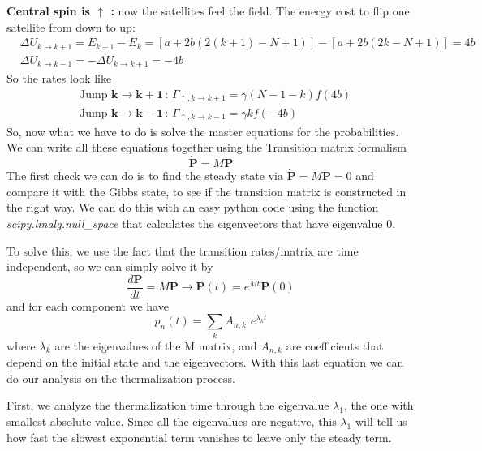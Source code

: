 \documentclass{article}
\begin{document}
\textbf{Central spin is $\uparrow$ :} now the satellites feel the field. The energy cost to flip one satellite from down to up:
\begin{align}
&\Delta U_{k\to k+1} = E_{k+1} - E_k = [a + 2b(2(k+1) - N + 1)] - [a + 2b(2k - N + 1)] = 4b\\
&\Delta U_{k\to k-1}=-\Delta U_{k\to k+1}=-4b
\end{align}
So the rates look like
\begin{align}
&\text{Jump } \mathbf{k \to k+1\,:\,} \Gamma_{\uparrow, k \to k+1} = \gamma (N-1-k) f(4b)\\
&\text{Jump } \mathbf{k \to k-1\,:\,} \Gamma_{\uparrow, k \to k-1} = \gamma k f(-4b)
\end{align}
So, now what we have to do is solve the master equations for the probabilities. We can write all these equations together using the Transition matrix formalism
\begin{equation}
    \mathbf{\dot{P}}=M\mathbf{P}
\end{equation}
The first check we can do is to find the steady state via $\mathbf{\dot{P}}=M\mathbf{P}=0$ and compare it with the Gibbs state, to see if the transition matrix is constructed in the right way. We can do this with an easy python code using the function \textit{scipy.linalg.null\_space} that calculates the eigenvectors that have eigenvalue 0.

To solve this, we use the fact that the transition rates/matrix are time independent, so we can simply solve it by
\begin{equation}
    \frac{d\mathbf{P}}{dt}=M\mathbf{P} \xrightarrow{}\mathbf{P}(t)=e^{Mt}\mathbf{P}(0)
\end{equation}
and for each component we have
\begin{equation}\label{pn solutions}
    p_n(t)=\sum_k A_{n,k}\,\,e^{\lambda_k t}
\end{equation}
where $\lambda_k$ are the eigenvalues of the M matrix, and $A_{n,k}$ are coefficients that depend on the initial state and the eigenvectors. 
\newpage
With this last equation we can do our analysis on the thermalization process.

\vspace{0.2 cm}
First, we analyze the thermalization time through the eigenvalue $\lambda_1$, the one with smallest absolute value. Since all the eigenvalues are negative, this $\lambda_1$ will tell us how fast the slowest exponential term vanishes to leave only the steady term.
\end{document}
